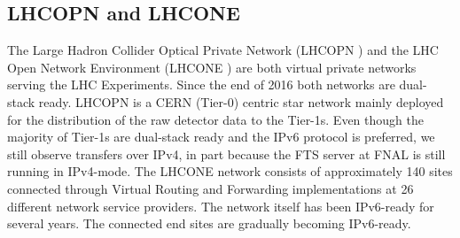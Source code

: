 \subsection{LHCOPN and LHCONE}
The  Large Hadron Collider Optical Private Network (LHCOPN \cite{opnone}) and the LHC Open Network Environment (LHCONE \cite{opnone}) are both virtual private networks serving the LHC Experiments. Since the end of 2016 both networks are dual-stack ready. LHCOPN is a CERN (Tier-0) centric star network mainly deployed for the distribution of the raw detector data to the Tier-1s. Even though the majority of Tier-1s are dual-stack ready and the IPv6 protocol is preferred, we still observe transfers over IPv4,  in part because the FTS server at FNAL is still running in IPv4-mode. The LHCONE network consists of approximately 140 sites connected through Virtual Routing and Forwarding implementations at 26 different network service providers. The network itself has been IPv6-ready for several years. The connected end sites are gradually becoming IPv6-ready. 

